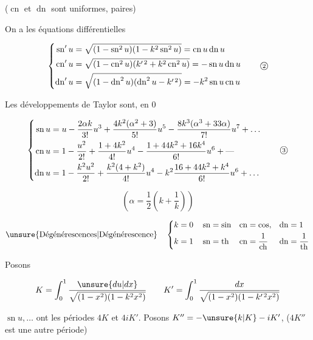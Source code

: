 ($\operatorname{cn}$ et $\operatorname{dn}$ sont uniformes, paires)

On a les équations différentielles

\[
\left\{\begin{aligned}
\operatorname{sn}'u&=\sqrt{(1-\operatorname{sn}^2u)(1-k^2\operatorname{sn}^2u)}=\operatorname{cn}u\operatorname{dn}u\\
\operatorname{cn}'u&=\sqrt{(1-\operatorname{cn}^2u)(k'^{\,2}+k^2\operatorname{cn}^2u)}=-\operatorname{sn}u\operatorname{dn}u\\
\operatorname{dn}'u&=\sqrt{(1-\operatorname{dn}^2u)(\operatorname{dn}^2u-k'^{\,2})}=-k^2\operatorname{sn}u\operatorname{cn}u
\end{aligned}\right.
\tag*{\textcircled{\scriptsize 2}}
\]

Les développements de Taylor sont, en $0$

\[
\left\{\begin{aligned}
\operatorname{sn}u&=u-\frac{2\alpha k}{3!}u^3+\frac{4k^2(\alpha^2+3)}{5!}u^5-\frac{8k^3(\alpha^3+33\alpha)}{7!}u^7+\ldots\\
\operatorname{cn}u&=1-\frac{u^2}{2!}+\frac{1+4k^2}{4!}u^4-\frac{1+44k^2+16k^4}{6!}u^6+\text{---}\\
\operatorname{dn}u&=1-\frac{k^2u^2}{2!}+\frac{k^2(4+k^2)}{4!}u^4-k^2\frac{16+44k^2+k^4}{6!}u^6+\ldots
\end{aligned}\right.
\tag*{\textcircled{\scriptsize 3}}
\]

\[\left(\alpha=\frac12\left(k+\frac1k\right)\right)\]

\[
\text{\unsure{Dégénérescences|Dégénérescence}}\quad
\left\{\begin{aligned}
k=0&\quad\operatorname{sn}=\sin&\operatorname{cn}&=\cos,&\operatorname{dn}&=1\\
k=1&\quad\operatorname{sn}=\operatorname{th}&\operatorname{cn}&=\frac1{\operatorname{ch}}&\operatorname{dn}&=\frac1{\operatorname{th}}
\end{aligned}\right.
\]

\quad Posons

\[
K=\int_0^1\frac{\unsure{du|dx}}{\sqrt{(1-x^2)(1-k^2x^2)}}\qquad
K'=\int_0^1\frac{dx}{\sqrt{(1-x^2)(1-k'^{\,2}x^2)}}
\]

$\operatorname{sn}u,\ldots$ ont les périodes $4K$ et $4iK'$. Posons $K''=-\unsure{k|K}-iK'$, ($4K''$ est une autre période)

